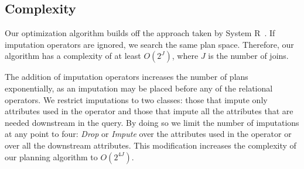 %
%
%
%
%
%
%

\subsection{Complexity}\label{sec:complexity}
Our optimization algorithm builds off the approach taken by System R~\cite{blasgen1981system}.
If imputation operators are ignored, we search the same plan space.
Therefore, our algorithm has a complexity of at least $O(2^J)$, where $J$ is the number of joins.

The addition of imputation operators increases the number of plans exponentially, as an imputation may be placed before any of the relational operators.
We restrict imputations to two classes: those that impute only attributes used in the operator and those that impute all the attributes that are needed downstream in the query.
By doing so we limit the number of imputations at any point to four: \textit{Drop} or \textit{Impute} over the attributes used in the operator or over all the downstream attributes.
This modification increases the complexity of our planning algorithm to $O(2^{4J})$.

